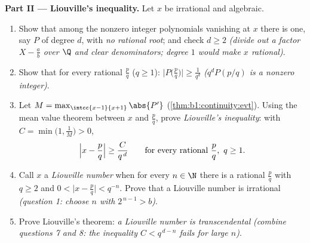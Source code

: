 \begin{problem}
\medskip
\noindent\textbf{Part II --- Liouville's inequality.} Let $x$ be
irrational and algebraic.
\begin{enumerate}[resume]
  \item Show that among the nonzero integer polynomials
        vanishing at $x$ there is one, say $P$ of degree $d$,
        with \emph{no rational root}; and check $d \geq 2$
        \emph{(divide out a factor $X - \frac ab$ over $\Q$ and
        clear denominators; degree $1$ would make $x$
        rational)}.
  \item Show that for every rational $\frac pq$ ($q \geq 1$):
        $\bigl|P\bigl(\frac pq\bigr)\bigr| \geq \frac{1}{q^d}$
        \emph{($q^d P(p/q)$ is a nonzero integer)}.
  \item Let $M = \max_{\intcc{x-1}{x+1}} \abs{P'}$
        (\cref{thm:b1:continuity:evt}). Using the mean value
        theorem between $x$ and $\frac pq$, prove
        \emph{Liouville's inequality}: with $C = \min\bigl(1,
        \frac 1M\bigr) > 0$,
        \[
        \Bigl| x - \frac pq \Bigr| \geq \frac{C}{q^{\,d}}
        \qquad\text{for every rational } \frac pq,\ q \geq 1 .
        \]
  \item Call $x$ a \emph{Liouville number} when for every $n \in
        \N$ there is a rational $\frac pq$ with $q \geq 2$ and
        $0 < \bigl|x - \frac pq\bigr| < q^{-n}$. Prove that a
        Liouville number is irrational \emph{(question 1: choose
        $n$ with $2^{\,n-1} > b$)}.
  \item Prove Liouville's theorem: \emph{a Liouville number is
        transcendental} \emph{(combine questions 7 and 8: the
        inequality $C < q^{\,d-n}$ fails for large $n$)}.
\end{enumerate}


\end{problem}
